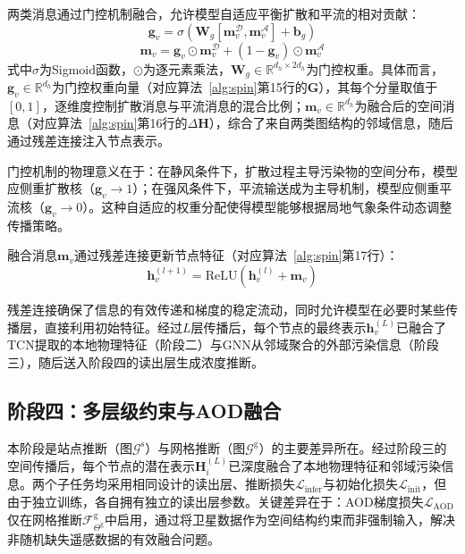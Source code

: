 两类消息通过门控机制融合，允许模型自适应平衡扩散和平流的相对贡献：
\begin{equation}
\mathbf{g}_v = \sigma\left(\mathbf{W}_g [\mathbf{m}_v^{\mathcal{D}}, \mathbf{m}_v^{\mathcal{A}}] + \mathbf{b}_g\right)
\label{eq:gate_weight}
\end{equation}
\begin{equation}
\mathbf{m}_v = \mathbf{g}_v \odot \mathbf{m}_v^{\mathcal{D}} + (1 - \mathbf{g}_v) \odot \mathbf{m}_v^{\mathcal{A}}
\label{eq:gate_fusion}
\end{equation}
\noindent 式中$\sigma$为Sigmoid函数，$\odot$为逐元素乘法，$\mathbf{W}_g \in \mathbb{R}^{d_h \times 2d_h}$为门控权重。具体而言，$\mathbf{g}_v \in \mathbb{R}^{d_h}$为门控权重向量（对应算法~\ref{alg:spin}第15行的$\mathbf{G}$），其每个分量取值于$[0,1]$，逐维度控制扩散消息与平流消息的混合比例；$\mathbf{m}_v \in \mathbb{R}^{d_h}$为融合后的空间消息（对应算法~\ref{alg:spin}第16行的$\Delta\mathbf{H}$），综合了来自两类图结构的邻域信息，随后通过残差连接注入节点表示。

门控机制的物理意义在于：在静风条件下，扩散过程主导污染物的空间分布，模型应侧重扩散核（$\mathbf{g}_v \to 1$）；在强风条件下，平流输送成为主导机制，模型应侧重平流核（$\mathbf{g}_v \to 0$）。这种自适应的权重分配使得模型能够根据局地气象条件动态调整传播策略。

融合消息$\mathbf{m}_v$通过残差连接更新节点特征（对应算法~\ref{alg:spin}第17行）：
\begin{equation}
\mathbf{h}_v^{(l+1)} = \text{ReLU}\left(\mathbf{h}_v^{(l)} + \mathbf{m}_v\right)
\label{eq:residual_update}
\end{equation}

\noindent 残差连接确保了信息的有效传递和梯度的稳定流动，同时允许模型在必要时某些传播层，直接利用初始特征。经过$L$层传播后，每个节点的最终表示$\mathbf{h}_v^{(L)}$已融合了TCN提取的本地物理特征（阶段二）与GNN从邻域聚合的外部污染信息（阶段三），随后送入阶段四的读出层生成浓度推断。




\subsection{阶段四：多层级约束与AOD融合}
\label{subsec:stage4_constraints}

本阶段是站点推断（图$\mathcal{G}^{\text{s}}$）与网格推断（图$\mathcal{G}^{\text{g}}$）的主要差异所在。经过阶段三的空间传播后，每个节点的潜在表示$\mathbf{H}_i^{(L)}$已深度融合了本地物理特征和邻域污染信息。两个子任务均采用相同设计的读出层、推断损失$\mathcal{L}_{\mathrm{infer}}$与初始化损失$\mathcal{L}_{\mathrm{init}}$，但由于独立训练，各自拥有独立的读出层参数。关键差异在于：AOD梯度损失$\mathcal{L}_{\mathrm{AOD}}$仅在网格推断$\mathcal{F}^{\text{g}}_{\Theta^{\text{g}}}$中启用，通过将卫星数据作为空间结构约束而非强制输入，解决非随机缺失遥感数据的有效融合问题。

